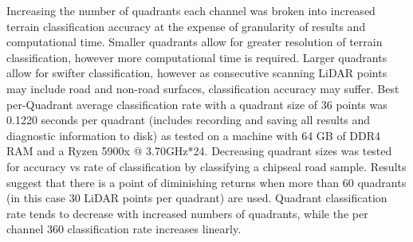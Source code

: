 \documentclass[journal,onecolumn]{IEEEtran}
\begin{document}
	{Increasing the number of quadrants each channel was broken into increased terrain classification accuracy at the expense of granularity of results and computational time. Smaller quadrants allow for greater resolution of terrain classification, however more computational time is required. Larger quadrants allow for swifter classification, however as consecutive scanning LiDAR points may include road and non-road surfaces, classification accuracy may suffer. Best per-Quadrant average classification rate with a quadrant size of 36 points was 0.1220 seconds per quadrant (includes recording and saving all results and diagnostic information to disk) as tested on a machine with 64 GB of DDR4 RAM and a Ryzen 5900x @ 3.70GHz*24. Decreasing quadrant sizes was tested for accuracy vs rate of classification by classifying a chipseal road sample. Results suggest that there is a point of diminishing returns when more than 60 quadrants (in this case 30 LiDAR points per quadrant) are used. Quadrant classification rate tends to decrease with increased numbers of quadrants, while the per channel 360 classification rate increases linearly.}
	
\end{document}
